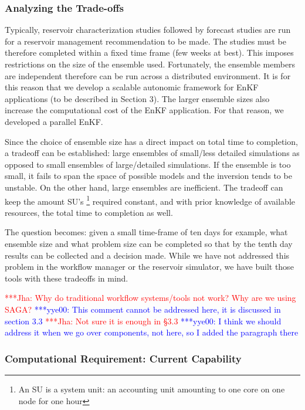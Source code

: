 \documentclass{acm_proc_article-sp}
\newcommand{\jhanote}[1]{ {\textcolor{red} { ***Jha: #1 }}}
\newcommand{\yyenote}[1]{ {\textcolor{blue} { ***yye00: #1 }}}
\newcommand{\jhanote}[1]{}
\newcommand{\yyenote}[1]{}
\begin{document}
\subsubsection{Analyzing the Trade-offs}  

Typically, reservoir characterization studies followed by forecast
studies are run for a reservoir management recommendation to be
made. The studies must be therefore completed within a fixed time frame
(few weeks at best). This imposes restrictions on the size of the
ensemble used. Fortunately, the ensemble members are independent
therefore can be run across a distributed environment. It is for this
reason that we develop a scalable autonomic framework for EnKF
applications (to be described in Section 3). The larger ensemble sizes
also increase the computational cost of the EnKF application. For that
reason, we developed a parallel EnKF.

Since the choice of ensemble size has a direct impact on total time to
completion, a tradeoff can be established: large ensembles of
small/less detailed simulations as opposed to small ensembles of
large/detailed simulations. If the ensemble is too small, it fails to
span the space of possible models and the inversion tends to
be unstable. On the other hand, large ensembles are
inefficient. The tradeoff can keep the amount SU's
\footnote{An SU is a system unit: an accounting unit
amounting to one core on one node for one hour} required
constant, and with prior knowledge of available resources, the total
time to completion as well.

The question becomes: given a small
time-frame of ten days for example, what ensemble size and what
problem size can be completed so that by the tenth day results can be
collected and a decision made. While we have not addressed this
problem in the workflow manager or the reservoir simulator, we have
built those tools with these tradeoffs in mind.

\jhanote{Why do traditional workflow systems/tools not work? Why are
  we using SAGA?} \yyenote{This comment cannot be addressed here, it
  is discussed in section 3.3} \jhanote{Not sure it is enough in §3.3}
\yyenote{I think we should address it when we go over components, not
  here, so I added the paragraph there}

\subsubsection{Computational Requirement: Current Capability}
\label{sec:compreq}
\end{document}
